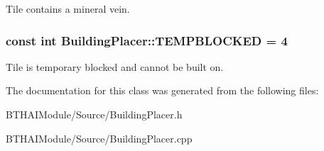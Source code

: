 Tile contains a mineral vein. \hypertarget{class_building_placer_a9979e3cb4ffded872c27d0e89539ee44}{
\subsubsection[{T\-E\-M\-P\-B\-L\-O\-C\-K\-E\-D}]{\setlength{\rightskip}{0pt plus 5cm}const int Building\-Placer\-::\-T\-E\-M\-P\-B\-L\-O\-C\-K\-E\-D = 4\hspace{0.3cm}{\ttfamily [static]}}}\label{class_building_placer_a9979e3cb4ffded872c27d0e89539ee44}
Tile is temporary blocked and cannot be built on. 

The documentation for this class was generated from the following files\-:\begin{DoxyCompactItemize}
\item 
B\-T\-H\-A\-I\-Module/\-Source/Building\-Placer.\-h\item 
B\-T\-H\-A\-I\-Module/\-Source/Building\-Placer.\-cpp\end{DoxyCompactItemize}
